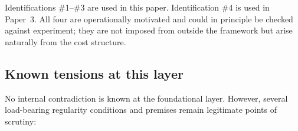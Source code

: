 \documentclass[11pt]{article}
\theoremstyle{remark}
\begin{document}
Identifications \#1--\#3 are used in this paper.  Identification \#4 is used in Paper~3.  All four are operationally motivated and could in principle be checked against experiment; they are not imposed from outside the framework but arise naturally from the cost structure.


\subsection{Known tensions at this layer}

No internal contradiction is known at the foundational layer.  However, several load-bearing regularity conditions and premises remain legitimate points of scrutiny:
\end{document}
